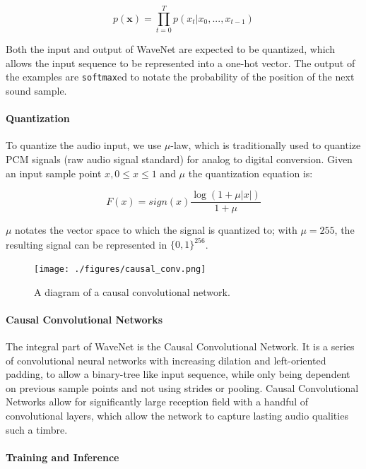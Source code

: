 \documentclass[12pt,a4paper,]{report}
\begin{document}
\begin{equation}
    p(\mathbf{x}) = \prod_{t=0}^{T} p(x_t | x_0, ..., x_{t-1})
\end{equation}

Both the input and output of WaveNet are expected to be quantized, which
allows the input sequence to be represented into a one-hot vector. The
output of the examples are \texttt{softmax}ed to notate the probability
of the position of the next sound sample.

\paragraph{Quantization}

To quantize the audio input, we use \(\mu\)-law, which is traditionally
used to quantize PCM signals (raw audio signal standard) for analog to
digital conversion. Given an input sample point \(x, 0 \leq x \leq 1\)
and \(\mu\) the quantization equation is:

\begin{equation}
    F(x) = sign(x) \frac{\log(1 + \mu \lvert x \lvert )}{1 +  \mu} \label{eq:mulaw}
\end{equation}

\(\mu\) notates the vector space to which the signal is quantized to;
with \(\mu = 255\), the resulting signal can be represented in
\(\{0, 1\}^{256}\).

\begin{figure}[h]
    \texttt{[image: ./figures/causal\_conv.png]}
    \centering
    \caption{A diagram of a causal convolutional network.} \label{fig:causal_conv}
\end{figure}

\paragraph{Causal Convolutional Networks}

The integral part of WaveNet is the Causal Convolutional Network. It is
a series of convolutional neural networks with increasing dilation and
left-oriented padding, to allow a binary-tree like input sequence, while
only being dependent on previous sample points and not using strides or
pooling. Causal Convolutional Networks allow for significantly large
reception field with a handful of convolutional layers, which allow the
network to capture lasting audio qualities such a timbre.

\paragraph{Training and Inference}
\end{document}

